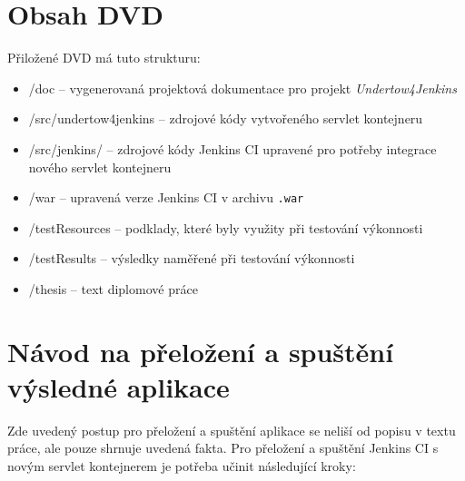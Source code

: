 
\chapter{Obsah DVD}
    Přiložené DVD má tuto strukturu:
    \begin{itemize}
        \item /doc -- vygenerovaná projektová dokumentace pro projekt \emph{Undertow4Jenkins}
        \item /src/undertow4jenkins -- zdrojové kódy vytvořeného servlet kontejneru
        \item /src/jenkins/ -- zdrojové kódy Jenkins CI upravené pro potřeby integrace nového servlet kontejneru
        \item /war -- upravená verze Jenkins CI v archivu \texttt{.war} 
        \item /testResources -- podklady, které byly využity při testování výkonnosti
        \item /testResults -- výsledky naměřené při testování výkonnosti
        \item /thesis -- text diplomové práce
    \end{itemize}


\chapter{Návod na přeložení a spuštění výsledné aplikace} \label{prilohaNavod}
    Zde uvedený postup pro přeložení a spuštění aplikace se neliší od popisu v textu práce,
    ale pouze shrnuje uvedená fakta.
    Pro přeložení a spuštění Jenkins CI s novým servlet kontejnerem
    je potřeba učinit následující kroky:

